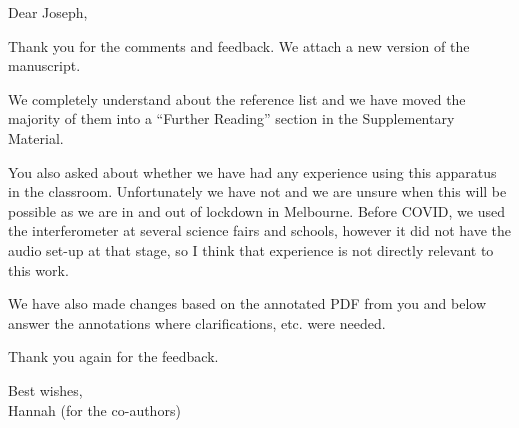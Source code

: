 \documentclass[a4paper, 10pt]{letter}
\begin{document}
Dear Joseph, 

Thank you for the comments and feedback. 
We attach a new version of the manuscript.

We completely understand about the reference list and we have moved the majority of them into a ``Further Reading'' section in the Supplementary Material. 

You also asked about whether we have had any experience using this apparatus in the classroom. Unfortunately we have not and we are unsure when this will be possible as we are in and out of lockdown in Melbourne. Before COVID, we used the interferometer at several science fairs and schools, however it did not have the audio set-up at that stage, so I think that experience is not directly relevant to this work. 

We have also made changes based on the annotated PDF from you and below answer the annotations where clarifications, etc. were needed. 

Thank you again for the feedback. 

Best wishes, \\
Hannah (for the co-authors)
 
\end{document}

